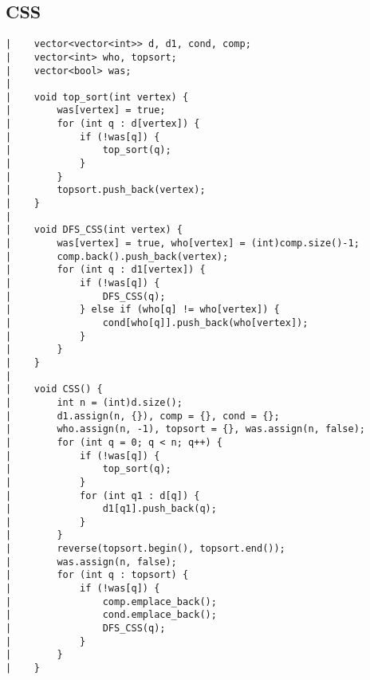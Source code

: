 \documentclass[a4paper, 10pt]{article}
\begin{document}
\begin{center}
\section*{CSS}
\begin{verbatim}
|    vector<vector<int>> d, d1, cond, comp;
|    vector<int> who, topsort;
|    vector<bool> was;
|    
|    void top_sort(int vertex) {
|        was[vertex] = true;
|        for (int q : d[vertex]) {
|            if (!was[q]) {
|                top_sort(q);
|            }
|        }
|        topsort.push_back(vertex);
|    }
|    
|    void DFS_CSS(int vertex) {
|        was[vertex] = true, who[vertex] = (int)comp.size()-1;
|        comp.back().push_back(vertex);
|        for (int q : d1[vertex]) {
|            if (!was[q]) {
|                DFS_CSS(q);
|            } else if (who[q] != who[vertex]) {
|                cond[who[q]].push_back(who[vertex]);
|            }
|        }
|    }
|    
|    void CSS() {
|        int n = (int)d.size();
|        d1.assign(n, {}), comp = {}, cond = {};
|        who.assign(n, -1), topsort = {}, was.assign(n, false);
|        for (int q = 0; q < n; q++) {
|            if (!was[q]) {
|                top_sort(q);
|            }
|            for (int q1 : d[q]) {
|                d1[q1].push_back(q);
|            }
|        }
|        reverse(topsort.begin(), topsort.end());
|        was.assign(n, false);
|        for (int q : topsort) {
|            if (!was[q]) {
|                comp.emplace_back();
|                cond.emplace_back();
|                DFS_CSS(q);
|            }
|        }
|    }
\end{verbatim}


\end{center}
\end{document}
